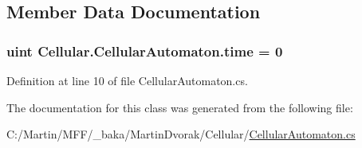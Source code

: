 \subsection{Member Data Documentation}
\hypertarget{class_cellular_1_1_cellular_automaton_a6eaa8a9840fbc4c875d4e7d5a14e5f70}{}
\subsubsection[{time}]{\setlength{\rightskip}{0pt plus 5cm}uint Cellular.\+Cellular\+Automaton.\+time = 0\hspace{0.3cm}{\ttfamily [protected]}}\label{class_cellular_1_1_cellular_automaton_a6eaa8a9840fbc4c875d4e7d5a14e5f70}


Definition at line 10 of file Cellular\+Automaton.\+cs.



The documentation for this class was generated from the following file\+:\begin{DoxyCompactItemize}
\item 
C\+:/\+Martin/\+M\+F\+F/\+\_\+baka/\+Martin\+Dvorak/\+Cellular/\hyperlink{_cellular_automaton_8cs}{Cellular\+Automaton.\+cs}\end{DoxyCompactItemize}
